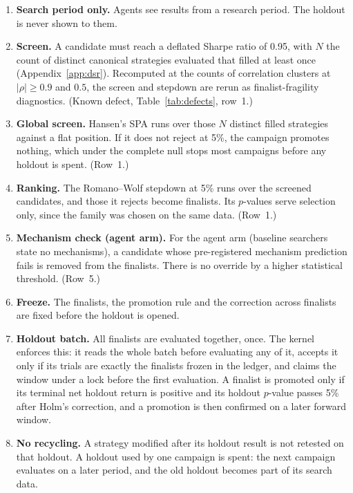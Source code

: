 \documentclass[11pt]{article}
\begin{document}
\begin{enumerate}
  \item \textbf{Search period only.} Agents see results from a research period. The holdout is never shown to them.
  \item \textbf{Screen.} A candidate must reach a deflated Sharpe ratio of 0.95, with $N$ the count of distinct canonical strategies evaluated that filled at least once (Appendix~\ref{app:dsr}). Recomputed at the counts of correlation clusters at $|\rho|\ge0.9$ and $0.5$, the screen and stepdown are rerun as finalist-fragility diagnostics. (Known defect, Table~\ref{tab:defects}, row~1.)
  \item \textbf{Global screen.} Hansen's SPA runs over those $N$ distinct filled strategies against a flat position. If it does not reject at 5\%, the campaign promotes nothing, which under the complete null stops most campaigns before any holdout is spent. (Row~1.)
  \item \textbf{Ranking.} The Romano--Wolf stepdown at 5\% runs over the screened candidates, and those it rejects become finalists. Its $p$-values serve selection only, since the family was chosen on the same data. (Row~1.)
  \item \textbf{Mechanism check (agent arm).} For the agent arm (baseline searchers state no mechanisms), a candidate whose pre-registered mechanism prediction fails is removed from the finalists. There is no override by a higher statistical threshold. (Row~5.)
  \item \textbf{Freeze.} The finalists, the promotion rule and the correction across finalists are fixed before the holdout is opened.
  \item \textbf{Holdout batch.} All finalists are evaluated together, once. The kernel enforces this: it reads the whole batch before evaluating any of it, accepts it only if its trials are exactly the finalists frozen in the ledger, and claims the window under a lock before the first evaluation. A finalist is promoted only if its terminal net holdout return is positive and its holdout $p$-value passes 5\% after Holm's correction, and a promotion is then confirmed on a later forward window.
  \item \textbf{No recycling.} A strategy modified after its holdout result is not retested on that holdout. A holdout used by one campaign is spent: the next campaign evaluates on a later period, and the old holdout becomes part of its search data.
\end{enumerate}
\end{document}
